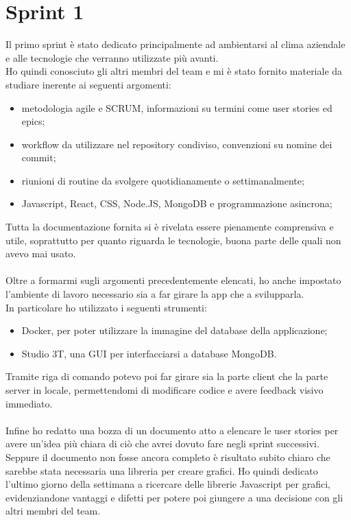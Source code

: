
\section{Sprint 1}
\label{sec:sprint1}

Il primo sprint è stato dedicato principalmente ad ambientarsi al clima aziendale e alle tecnologie che verranno utilizzate più avanti. \\
Ho quindi conosciuto gli altri membri del team e mi è stato fornito materiale da studiare inerente ai seguenti argomenti:
\begin{itemize}
  \item metodologia agile e SCRUM, informazioni su termini come user stories ed epics;
  \item workflow da utilizzare nel repository condiviso, convenzioni su nomine dei commit;
  \item riunioni di routine da svolgere quotidianamente o settimanalmente;
  \item Javascript, React, CSS, Node.JS, MongoDB e programmazione asincrona; 
\end{itemize}

\noindent Tutta la documentazione fornita si è rivelata essere pienamente comprensiva e utile, soprattutto per quanto riguarda le tecnologie, buona parte delle quali non avevo mai usato. \\\\
Oltre a formarmi sugli argomenti precedentemente elencati, ho anche impostato l'ambiente di lavoro necessario sia a far girare la app che a svilupparla. \\
In particolare ho utilizzato i seguenti strumenti:
\begin{itemize}
  \item Docker, per poter utilizzare la immagine del database della applicazione;
  \item Studio 3T, una GUI per interfacciarsi a database MongoDB.
\end{itemize}

\noindent Tramite riga di comando potevo poi far girare sia la parte client che la parte server in locale, permettendomi di modificare codice e avere feedback visivo immediato. \\\\
\noindent Infine ho redatto una bozza di un documento atto a elencare le user stories per avere un'idea più chiara di ciò che avrei dovuto fare negli sprint successivi.\\
Seppure il documento non fosse ancora completo è risultato subito chiaro che sarebbe stata necessaria una libreria per creare grafici. Ho quindi dedicato l'ultimo giorno della settimana a ricercare delle librerie Javascript per grafici, evidenziandone vantaggi e difetti per potere poi giungere a una decisione con gli altri membri del team.